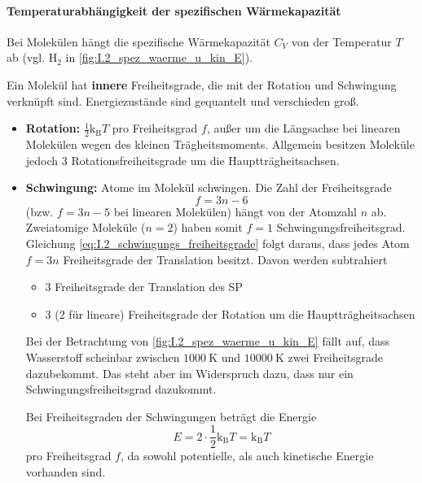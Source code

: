 \paragraph{Temperaturabhängigkeit der spezifischen Wärmekapazität} 
    Bei Molekülen hängt die spezifische Wärmekapazität $C_{V}$ von der Temperatur $T$ ab (vgl. $\text{H}_{2}$ in \autoref{fig:I.2_spez_waerme_u_kin_E}).\par
    
    Ein Molekül hat \textbf{innere} Freiheitsgrade, die mit der Rotation und Schwingung verknüpft sind. Energiezustände sind gequantelt und verschieden groß.
    \begin{itemize}
    	\item \textbf{Rotation:} $\frac{1}{2} \mathrm{k}_\mathrm{B} T $ pro Freiheitsgrad $f$, außer um die Längsachse bei linearen Molekülen wegen des kleinen Trägheitsmoments. Allgemein besitzen Moleküle jedoch 3 Rotationsfreiheitsgrade um die Hauptträgheitsachsen.
    	\item \textbf{Schwingung:} Atome im Molekül schwingen. Die Zahl der Freiheitsgrade 
        \begin{equation}
            f=3n-6
            \label{eq:I.2_schwingungs_freiheitsgrade}
        \end{equation}
        (bzw. $f=3n-5$ bei linearen Molekülen) hängt von der Atomzahl $n$ ab. Zweiatomige Moleküle ($n=2$) haben somit $f=1$ Schwingungsfreiheitsgrad.\\

    	Gleichung \eqref{eq:I.2_schwingungs_freiheitsgrade} folgt daraus, dass jedes Atom $f=3n$ Freiheitsgrade der Translation besitzt. Davon werden subtrahiert
        \begin{itemize}
        	\item 3 Freiheitsgrade der Translation des SP
        	\item 3 (2 für lineare) Freiheitsgrade der Rotation um die Hauptträgheitsachsen
        \end{itemize}
        \begin{verbal}
            Bei der Betrachtung von \autoref{fig:I.2_spez_waerme_u_kin_E} fällt auf, dass Wasserstoff scheinbar zwischen $\SI{1000}{\kelvin}$ und $\SI{10000}{\kelvin}$ zwei Freiheitsgrade dazubekommt. Das steht aber im Widerspruch dazu, dass nur ein Schwingungsfreiheitsgrad dazukommt.
        \end{verbal}
        Bei Freiheitsgraden der Schwingungen beträgt die Energie
        $$
        E = 2 \cdot \frac{1}{2} \mathrm{k}_\mathrm{B} T = \mathrm{k}_\mathrm{B}T
        $$ 
        pro Freiheitsgrad $f$, da sowohl potentielle, als auch kinetische Energie vorhanden sind.
        \end{itemize}

